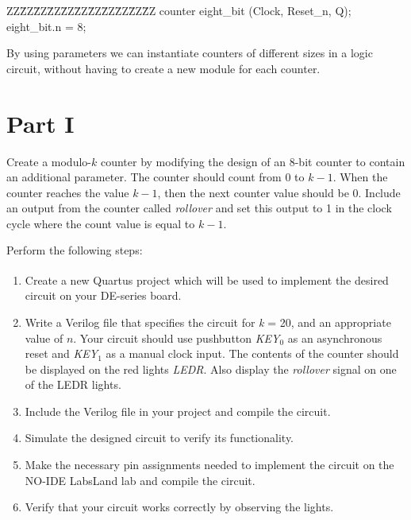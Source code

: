 \documentclass[epsfig,10pt,fullpage]{article}
\begin{document}
\begin{center}
\begin{minipage}[t]{12.5 cm}
\begin{tabbing}
ZZ\=ZZ\=ZZ\=ZZ\=ZZ\=ZZ\=ZZ\=ZZ\=ZZ\=ZZ\=ZZ\kill
counter eight\_bit (Clock, Reset\_n, Q);\\
 eight\_bit.n = 8;
\end{tabbing}
\end{minipage}
\end{center}

By using parameters we can instantiate counters of different sizes in a logic circuit, without 
having to create a new module for each counter.

\section*{Part I}
Create a modulo-$k$ counter by modifying the design of an 8-bit counter to contain an 
additional parameter. The counter should count from $0$ to $k-1$. When the counter reaches 
the value $k-1$, then the next counter value should be $0$. Include an output from the
counter called {\it rollover} and set this output to 1 in the clock cycle where the count value
is equal to $k-1$.

Perform the following steps:
\begin{enumerate}
\item Create a new Quartus\textsuperscript{\textregistered} project which will be used to implement the desired circuit
on your DE-series board.
\item Write a Verilog file that specifies the circuit for {\it k} = 20, and an appropriate
value of $n$.  Your circuit should use pushbutton {\it KEY}$_0$ as an asynchronous reset 
and {\it KEY}$_1$ as a manual clock input. 
The contents of the counter should be displayed on the red lights {\it LEDR}. Also display 
the {\it rollover} signal on one of the LEDR lights.
\item Include the Verilog file in your project and compile the circuit.
\item Simulate the designed circuit to verify its functionality.
\item Make the necessary pin assignments needed to implement the circuit on the NO-IDE LabsLand lab and compile the circuit.
\item Verify that your circuit works correctly by observing the lights.
\end{enumerate}
\end{document}
